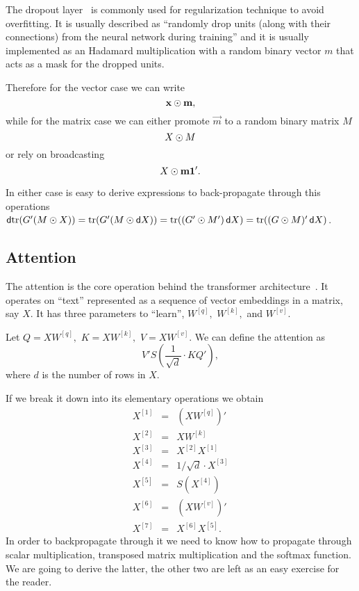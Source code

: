 \documentclass{sapthesis}
\begin{document}
The dropout layer~\cite{srivastava2014} is commonly used for regularization
technique to avoid overfitting. It is usually described as ``randomly drop units
(along with their connections) from the neural network during training'' and it
is usually implemented as an Hadamard multiplication with a random binary vector
\(m\) that acts as a mask for the dropped units.

Therefore for the vector case we can write \[\mathbf{x} \odot \mathbf{m},\] while for
the matrix case we can either promote \(\vec m\) to a random binary matrix \(M\)
\[X \odot M\] or rely on broadcasting \[X \odot \mathbf{m} \mathbf{1}'.\]

In either case is easy to derive expressions to back-propagate through this
operations \(\mathop{}\!\mathsf d\mathrm{tr}(G' (M \odot X)) = \mathrm{tr}(G' (M \odot \mathop{}\!\mathsf d X)) =
\mathrm{tr}((G' \odot M') \mathop{}\!\mathsf d X) = \mathrm{tr}((G \odot M)' \mathop{}\!\mathsf d X)\).

\subsection{Attention}

The attention is the core operation behind the transformer
architecture~\cite{vaswani2017}. It operates on ``text'' represented as a
sequence of vector embeddings in a matrix, say \(X\). It has three parameters to
``learn'', \(W^{[q]},\) \(W^{[k]},\) and \(W^{[v]}.\)

Let \(Q = X W^{[q]},\) \(K = X W^{[k]},\) \(V = X W^{[v]}\). We can define the
attention as \[V' S\left(\frac1{\sqrt{d}} \cdot K Q'\right),\] where \(d\) is
the number of rows in \(X.\)

If we break it down into its elementary operations we obtain
\begin{eqnarray*}
    X^{[1]} &= & (X W^{[q]})'\\
    X^{[2]} &= & X W^{[k]}\\
    X^{[3]} &= & X^{[2]} X^{[1]}\\
    X^{[4]} &= & 1/\sqrt d \cdot X^{[3]}\\
    X^{[5]} &= & S(X^{[4]})\\
    X^{[6]} &= & (X W^{[v]})'\\
    X^{[7]} &= & X^{[6]} X^{[5]}.
\end{eqnarray*}
In order to backpropagate through it we need to know how to propagate through
scalar multiplication, transposed matrix multiplication and the softmax
function. We are going to derive the latter, the other two are left as an easy
exercise for the reader.
\end{document}
